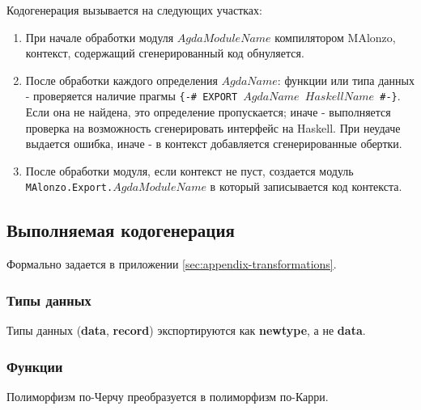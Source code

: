 Кодогенерация вызывается на следующих участках:
\begin{enumerate}
\item При начале обработки модуля \(AgdaModuleName\) компилятором MAlonzo,
      контекст, содержащий сгенерированный код обнуляется.
\item После обработки каждого определения \(AgdaName\): функции или типа данных -
      проверяется наличие прагмы \texttt{\{-\# EXPORT \(AgdaName\) \(HaskellName\) \#-\}}.
      Если она не найдена, это определение пропускается; иначе - выполняется проверка
      на возможность сгенерировать интерфейс на Haskell. При неудаче выдается ошибка,
      иначе - в контекст добавляется сгенерированные обертки.
\item После обработки модуля, если контекст не пуст, создается модуль \texttt{MAlonzo.Export.\(AgdaModuleName\)}
      в который записывается код контекста.
\end{enumerate}

\subsection{Выполняемая кодогенерация}

Формально задается в приложении \ref{sec:appendix-transformations}.

\subsubsection{Типы данных}

Типы данных (\textbf{data}, \textbf{record}) экспортируются как \textbf{newtype},
а не \textbf{data}.

\subsubsection{Функции}

Полиморфизм по-Черчу преобразуется в полиморфизм по-Карри.
